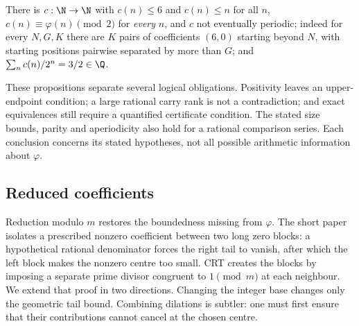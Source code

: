 \begin{prop}
\label{prop:parity}
There is $c : \N \to \N$ with $c(n) \le 6$ and $c(n) \le n$ for all $n$,
$c(n) \equiv \varphi(n) \pmod 2$ for \emph{every} $n$, and $c$ not eventually
periodic; indeed for every $N, G, K$ there are $K$ pairs of coefficients
$(6,0)$ starting beyond $N$, with starting positions pairwise separated
by more than $G$; and
$\sum_n c(n)/2^{n} = 3/2 \in \Q$.
\end{prop}

These propositions separate several logical obligations. Positivity leaves
an upper-endpoint condition; a large rational carry rank is not a contradiction;
and exact equivalences still require a quantified certificate condition. The stated size
bounds, parity and aperiodicity also hold for a rational comparison series. Each
conclusion concerns its stated hypotheses, not all possible arithmetic
information about $\varphi$.

\subsection{Reduced coefficients}\label{sub:reduced-coefficients}

Reduction modulo $m$ restores the boundedness missing from $\varphi$.
The short paper isolates a prescribed nonzero coefficient between two
long zero blocks: a hypothetical rational denominator forces the
right tail to vanish, after which the left block makes the nonzero
centre too small. CRT creates the blocks by imposing a separate
prime divisor congruent to $1\pmod m$ at each neighbour.
We extend that proof in two directions. Changing the integer base
changes only the geometric tail bound. Combining dilations is subtler:
one must first ensure that their contributions cannot cancel at the
chosen centre.


